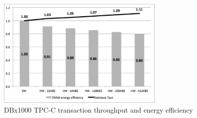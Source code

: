 \begin{figure}[h]
  \centering
  \includegraphics[width=3.2in]{figures/dbx1000_tput_energy.pdf}
  \caption{DBx1000 TPC-C transaction throughput and energy efficiency}
  \label{fig:dbx1000_tput_energy}
\end{figure}
